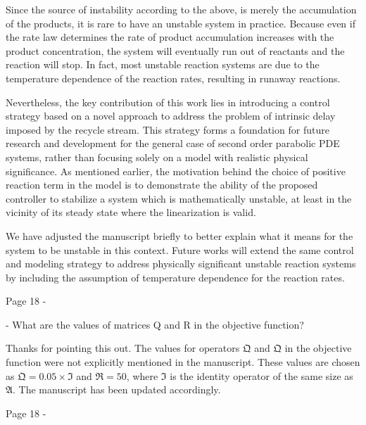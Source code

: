 \documentclass[12pt,answers]{exam}
\begin{document}
\begin{questions}
\begin{solutionorbox}
    Since the source of instability according to the above, is merely the accumulation of the products, it is rare to have an unstable system in practice. Because even if the rate law determines the rate of product accumulation increases with the product concentration, the system will eventually run out of reactants and the reaction will stop. In fact, most unstable reaction systems are due to the temperature dependence of the reaction rates, resulting in runaway reactions.
    
    Nevertheless, the key contribution of this work lies in introducing a control strategy based on a novel approach to address the problem of intrinsic delay imposed by the recycle stream. This strategy forms a foundation for future research and development for the general case of second order parabolic PDE systems, rather than focusing solely on a model with realistic physical significance. As mentioned earlier, the motivation behind the choice of positive reaction term in the model is to demonstrate the ability of the proposed controller to stabilize a system which is mathematically unstable, at least in the vicinity of its steady state where the linearization is valid. 
    
    We have adjusted the manuscript briefly to better explain what it means for the system to be unstable in this context. Future works will extend the same control and modeling strategy to address physically significant unstable reaction systems by including the assumption of temperature dependence for the reaction rates.

    \end{solutionorbox}


    \question Page 18 - 

    - What are the values of matrices Q and R in the objective function?

    \begin{solutionorbox}
        Thanks for pointing this out. The values for operators $\mathfrak{Q}$ and $\mathfrak{Q}$ in the objective function were not explicitly mentioned in the manuscript. These values are chosen as $\mathfrak{Q} = 0.05 \times \mathfrak{I}$ and $\mathfrak{R} = 50$, where $\mathfrak{I}$ is the identity operator of the same size as $\mathfrak{A}$. The manuscript has been updated accordingly.
    \end{solutionorbox}


    \question Page 18 - 


\end{questions}
\end{document}
